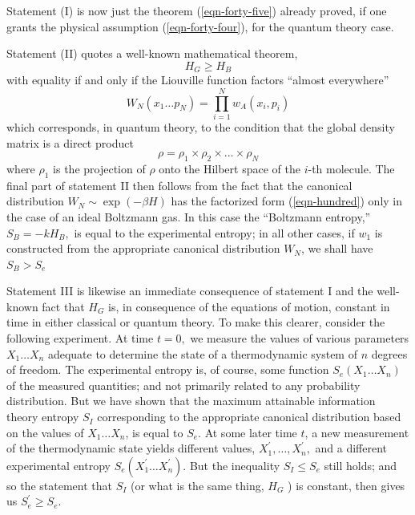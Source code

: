 \documentclass[]{article}
\begin{document}
Statement (I) is now just the theorem (\ref{eqn-forty-five}) already proved, if one grants the physical assumption (\ref{eqn-forty-four}), for the quantum theory case.

Statement (II) quotes a well-known mathematical theorem,
\begin{equation}
H_{ G } \geq H _{ B }
\end{equation}
with equality if and only if the Liouville function factors ``almost everywhere''
\begin{equation}
W _{ N }\left( x _{1} \ldots p _{ N }\right)=\prod_{ i =1}^{ N } w _{ A }\left( x _{ i }, p _{ i }\right) \label{eqn-hundred}
\end{equation}
which corresponds, in quantum theory, to the condition that the global density matrix is a direct product\citep{Jaynes-information-II-57}
\begin{equation}
\rho=\rho_{1} \times \rho_{2} \times \ldots \times \rho_{ N }
\end{equation}
where $\rho_{1}$ is the projection of $\rho$ onto the Hilbert space of the $i$-th molecule. The final part of statement II then follows from the fact that the canonical distribution $W_{N} \sim \exp (-\beta H)$ has the factorized form (\ref{eqn-hundred}) only in the case of an ideal Boltzmann gas. In this case the ``Boltzmann entropy,'' $S _{ B }=- kH _{ B },$ is equal to the experimental entropy; in all other cases, if $w_{1}$ is constructed from the appropriate canonical distribution $W _{ N }$, we shall have $S _{ B }> S _{ e }$

Statement III is likewise an immediate consequence of statement I and the well-known fact that $H _{ G }$ is, in consequence of the equations of motion, constant in time in either classical or quantum theory. To make this clearer, consider the following experiment. At time $t=0,$ we measure the values of various parameters $X_{1} \ldots X_{n}$ adequate to determine the state of a thermodynamic system of $n$ degrees of freedom. The experimental entropy is, of course, some function $S_{e}\left(X_{1} \ldots X_{n}\right)$ of the measured quantities; and not primarily related to any probability distribution. But we have shown that the maximum attainable information theory entropy $S _{ I }$ corresponding to the appropriate canonical distribution based on the values of $X_{1} \ldots X_{n}$, is equal to $S_{e}$. At some later time $t$, a new measurement of the thermodynamic state yields different values, $X_{1}^{\prime}, \ldots, X_{n}^{\prime},$ and a different experimental entropy $S_{e}\left(X_{1}^{\prime} \ldots X_{n}^{\prime}\right)$. But
the inequality $S _{ I } \leq S _{ e }$ still holds; and so the statement that $S _{I}$ (or what is the same thing, $H _{ G }$ ) is constant, then gives us $S^\prime_{ e } \geq S _{ e }$.
\end{document}
